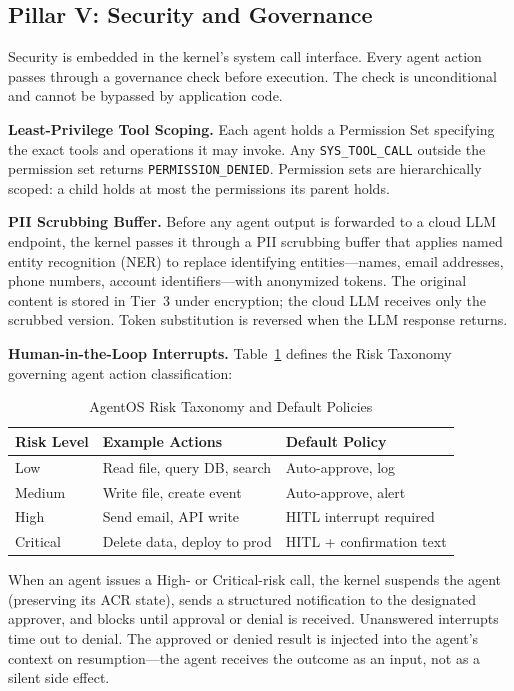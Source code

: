 \documentclass[journal]{IEEEtran}
\begin{document}
\subsection{Pillar V: Security and Governance}
\label{sec:security}

Security is embedded in the kernel's system call interface. Every agent action passes through a governance check before execution. The check is unconditional and cannot be bypassed by application code.

\textbf{Least-Privilege Tool Scoping.} Each agent holds a Permission Set specifying the exact tools and operations it may invoke. Any \texttt{SYS\_TOOL\_CALL} outside the permission set returns \texttt{PERMISSION\_DENIED}. Permission sets are hierarchically scoped: a child holds at most the permissions its parent holds.

\textbf{PII Scrubbing Buffer.} Before any agent output is forwarded to a cloud LLM endpoint, the kernel passes it through a PII scrubbing buffer that applies named entity recognition (NER) to replace identifying entities---names, email addresses, phone numbers, account identifiers---with anonymized tokens. The original content is stored in Tier~3 under encryption; the cloud LLM receives only the scrubbed version. Token substitution is reversed when the LLM response returns.

\textbf{Human-in-the-Loop Interrupts.} Table~\ref{tab:risk} defines the Risk Taxonomy governing agent action classification:

\begin{table}[h]
\caption{AgentOS Risk Taxonomy and Default Policies}
\label{tab:risk}
\centering
\begin{tabular}{p{1.5cm}p{3cm}p{3cm}}
\toprule
\textbf{Risk Level} & \textbf{Example Actions} & \textbf{Default Policy} \\
\midrule
Low    & Read file, query DB, search    & Auto-approve, log \\
Medium & Write file, create event       & Auto-approve, alert \\
High   & Send email, API write          & HITL interrupt required \\
Critical & Delete data, deploy to prod  & HITL + confirmation text \\
\bottomrule
\end{tabular}
\end{table}

When an agent issues a High- or Critical-risk call, the kernel suspends the agent (preserving its ACR state), sends a structured notification to the designated approver, and blocks until approval or denial is received. Unanswered interrupts time out to denial. The approved or denied result is injected into the agent's context on resumption---the agent receives the outcome as an input, not as a silent side effect.
\end{document}
